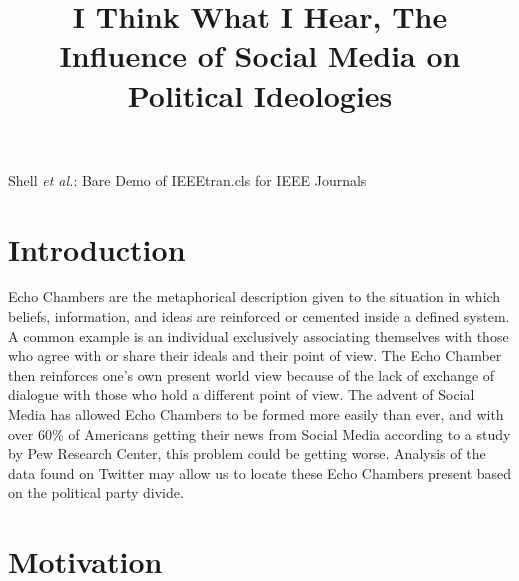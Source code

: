 \documentclass[journal]{IEEEtran}
\begin{document}
	
	
	\title{I Think What I Hear, The Influence of Social Media on Political Ideologies}
	
	
	\author{
	}
	
	{Shell \MakeLowercase{\textit{et al.}}: Bare Demo of IEEEtran.cls for IEEE Journals}
	
	
	\maketitle
	
	
	
	\IEEEpeerreviewmaketitle
	
	
	
	\section{Introduction}
	
	Echo Chambers are the metaphorical description given to the situation in which beliefs, information, and ideas are reinforced or cemented inside a defined system. A common example is an individual exclusively associating themselves with those who agree with or share their ideals and their point of view. The Echo Chamber then reinforces one’s own present world view because of the lack of exchange of dialogue with those who hold a different point of view. The advent of Social Media has allowed Echo Chambers to be formed more easily than ever, and with over 60\% of Americans getting their news from Social Media according to a study by Pew Research Center, this problem could be getting worse. Analysis of the data found on Twitter may allow us to locate these Echo Chambers present based on the political party divide.
	
	\section{Motivation}
	
\end{document}
